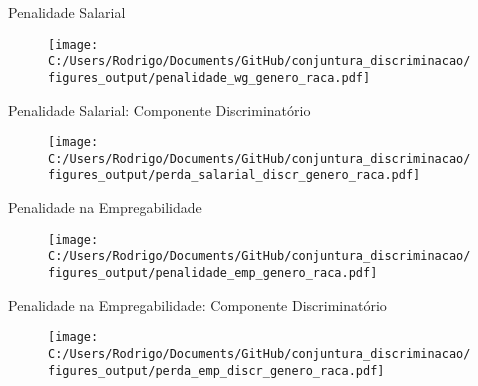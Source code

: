 \documentclass[10pt, xcolor=x11names,compress]{beamer}
\begin{document}
	\begin{frame}{Penalidade Salarial}
		\begin{figure}
			\centering
			\texttt{[image: C:/Users/Rodrigo/Documents/GitHub/conjuntura\_discriminacao/figures\_output/penalidade\_wg\_genero\_raca.pdf]}
		\end{figure}
	\end{frame}
	
	\begin{frame}{Penalidade Salarial: Componente Discriminatório}
		\begin{figure}
			\centering
			\texttt{[image: C:/Users/Rodrigo/Documents/GitHub/conjuntura\_discriminacao/figures\_output/perda\_salarial\_discr\_genero\_raca.pdf]}
		\end{figure}
	\end{frame}	
	
	\begin{frame}{Penalidade na Empregabilidade}
		\begin{figure}
			\centering
			\texttt{[image: C:/Users/Rodrigo/Documents/GitHub/conjuntura\_discriminacao/figures\_output/penalidade\_emp\_genero\_raca.pdf]}
		\end{figure}
	\end{frame}
	
	\begin{frame}{Penalidade na Empregabilidade: Componente Discriminatório}
		\begin{figure}
			\centering
			\texttt{[image: C:/Users/Rodrigo/Documents/GitHub/conjuntura\_discriminacao/figures\_output/perda\_emp\_discr\_genero\_raca.pdf]}
		\end{figure}
	\end{frame}
	
\end{document}
